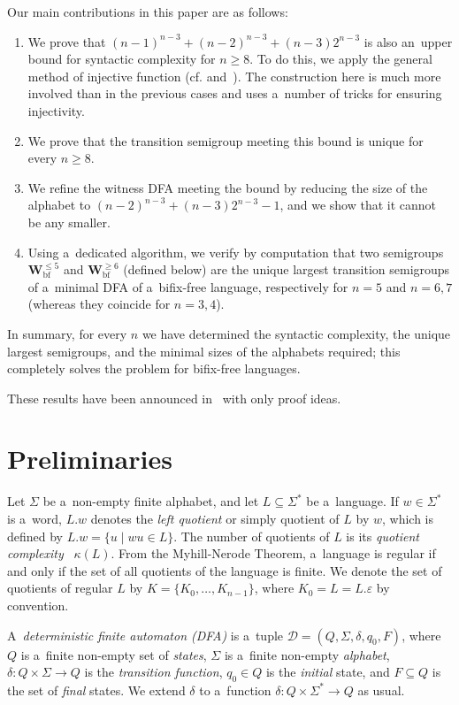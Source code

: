 \documentclass{amsart}
\renewcommand{\le}{\leqslant}
\renewcommand{\ge}{\geqslant}
\newcommand{\Sig}{\Sigma}
\newcommand{\Vbf}{\mathbf{W}^{\le 5}_{\mathrm{bf}}}
\newcommand{\Wbf}{\mathbf{W}^{\ge 6}_{\mathrm{bf}}}
\newcommand{\cD}{{\mathcal D}}
\begin{document}
Our main contributions in this paper are as follows:
\begin{enumerate}
\item We prove that $(n-1)^{n-3}+(n-2)^{n-3}+(n-3)2^{n-3}$ is also an~upper bound for syntactic complexity for $n \ge 8$.
To do this, we apply the general method of injective function (cf. \cite{BrSz14a} and~\cite{BrSz15SyntacticComplexityOfSuffixFree}).
The construction here is much more involved than in the previous cases and uses a~number of tricks for ensuring injectivity.
\item We prove that the transition semigroup meeting this bound is unique for every $n \ge 8$.
\item We refine the witness DFA meeting the bound by reducing the size of the alphabet to $(n-2)^{n-3} + (n-3)2^{n-3} - 1$, and we show that it cannot be any smaller.
\item Using a~dedicated algorithm, we verify by computation that two semigroups $\Vbf$ and $\Wbf$ (defined below) are the unique largest transition semigroups of a~minimal DFA of a~bifix-free language, respectively for $n=5$ and $n=6,7$ (whereas they coincide for $n=3,4$).
\end{enumerate}
In summary, for every $n$ we have determined the syntactic complexity, the unique largest semigroups, and the minimal sizes of the alphabets required; this completely solves the problem for bifix-free languages.

These results have been announced in~\cite{SzWi17SyntacticComplexityOfBifixFree} with only proof ideas.


\section{Preliminaries}

Let $\Sigma$ be a~non-empty finite alphabet, and let $L \subseteq \Sigma^*$ be a~language.
If $w \in \Sigma^*$ is a~word, $L.w$ denotes the \emph{left quotient} or simply quotient of $L$ by $w$, which is defined by $L.w = \{u \mid wu \in L\}$.
The number of quotients of $L$ is its \emph{quotient complexity}~\cite{Brz10} $\kappa(L)$. 
From the Myhill-Nerode Theorem, a~language is regular if and only if the set of all quotients of the language is finite.
We denote the set of quotients of regular $L$ by $K=\{K_0,\dots,K_{n-1}\}$, where $K_0=L=L.\varepsilon$ by convention.

A~\emph{deterministic finite automaton (DFA)} is a~tuple $\cD=(Q, \Sigma, \delta, q_0,F)$, where $Q$ is a~finite non-empty set of \emph{states}, $\Sigma$ is a~finite non-empty \emph{alphabet}, $\delta\colon Q\times \Sigma\to Q$ is the \emph{transition function}, $q_0\in Q$ is the \emph{initial} state, and $F\subseteq Q$ is the set of \emph{final} states.
We extend $\delta$ to a~function $\delta\colon Q\times \Sig^*\to Q$ as usual.
\end{document}
